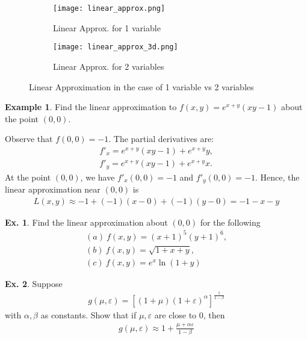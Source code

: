 \documentclass[10pt,a4paper]{book}
\theoremstyle{definition}\newtheorem{definition}{Definition}
\theoremstyle{definition}\newtheorem{fact}{Fact}
\theoremstyle{definition}\newtheorem{ex}{Ex.}
\theoremstyle{definition}\newtheorem{project}{Project}
\theoremstyle{definition}\newtheorem{problem}{Problem}
\theoremstyle{definition}\newtheorem{example}{Example}
\numberwithin{theorem}{chapter}
\numberwithin{corollary}{chapter}
\numberwithin{assumption}{chapter}
\numberwithin{definition}{chapter}
\numberwithin{prop}{chapter}
\numberwithin{notation}{chapter}
\numberwithin{problem}{chapter}
\numberwithin{example}{chapter}
\numberwithin{fact}{chapter}
\numberwithin{ex}{chapter}
\begin{document}
	\begin{figure}[h!]
		\centering
		\begin{subfigure}[b]{0.45\linewidth}
			\texttt{[image: linear\_approx.png]}
			\caption{Linear Approx. for 1 variable}
		\end{subfigure}
		\begin{subfigure}[b]{0.45\linewidth}
			\texttt{[image: linear\_approx\_3d.png]}
			\caption{Linear Approx. for 2 variables}
		\end{subfigure}
		\caption{Linear Approximation in the case of 1 variable vs 2 variables}
		\label{fig:linapprox}
	\end{figure}
	
	\begin{example}
		Find the linear approximation to $f(x,y) = e^{x+y} (xy-1)$ about the point $(0,0)$.
		
		Observe that $f(0,0) = -1$. The partial derivatives are:
		\begin{align*}
			f'_x = e^{x+y}(xy-1) + e^{x+y} y, \\
			f'_y = e^{x+y}(xy-1) + e^{x+y} x. 
		\end{align*}
		At the point $(0,0)$, we have $f'_x (0,0) = -1$ and $f'_y (0,0) = -1$. Hence, the linear approximation near $(0,0)$ is
		\begin{align*}
			L(x,y)  \approx -1 + (-1)(x-0) + (-1)(y-0) = -1 - x -y 
		\end{align*}
		
	\end{example}
	
	\begin{ex}
		Find the linear approximation about $(0,0)$ for the following
		\begin{align*}
			(a) \ f(x,y) = (x + 1)^5 (y + 1)^6, \\
			(b) \ f(x,y) = \sqrt{1 + x + y},    \\
			(c) \ f(x,y) = e^x \ln (1+y)        
		\end{align*}
	\end{ex}
	
	\begin{ex}
		Suppose 
		\begin{align*}
			g(\mu,\varepsilon) = \left[(1+\mu)(1+\varepsilon)^\alpha \right]^{\frac{1}{1-\beta}} 
		\end{align*}
		with $\alpha, \beta$ as constants. Show that if $\mu, \varepsilon$ are close to 0, then
		\begin{align*}
			g(\mu,\varepsilon) \approx 1 + \frac{\mu+\alpha\varepsilon}{1-\beta} 
		\end{align*}
	\end{ex}
	
\end{document}
